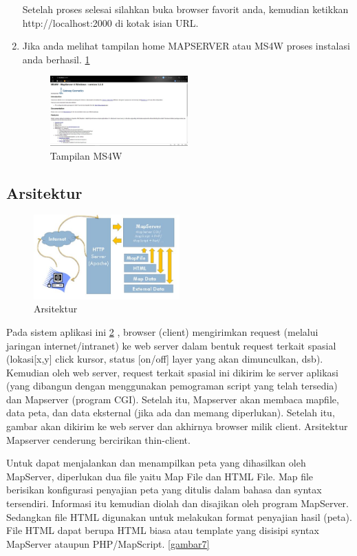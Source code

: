 \begin{enumerate}
Setelah proses selesai silahkan buka browser favorit anda, kemudian ketikkan http://localhost:2000 di kotak isian URL. 
\item
Jika anda melihat tampilan home MAPSERVER atau MS4W proses instalasi anda berhasil. \ref{gambar4}
\begin{figure}[ht]
	    \centerline{\includegraphics[width=0.50\textwidth]{figures/gambar4.JPG}}
	    \caption{Tampilan MS4W}
		\label{gambar4}
		\end{figure}
\end{enumerate}


\subsection{Arsitektur}
\begin{figure}[ht]
	    \centerline{\includegraphics[width=0.50\textwidth]{figures/gambar6.JPG}}
	    \caption{Arsitektur}
		\label{gambar6}
		\end{figure}
Pada sistem aplikasi ini \ref{gambar6} , browser (client) mengirimkan request (melalui jaringan internet/intranet) ke web server dalam bentuk request terkait spasial (lokasi[x,y] click kursor, status [on/off] layer yang akan dimunculkan, dsb).
Kemudian oleh web server, request terkait spasial ini dikirim ke server aplikasi (yang dibangun dengan menggunakan pemograman script yang telah tersedia) dan Mapserver (program CGI). Setelah itu, Mapserver akan membaca mapfile, data peta, dan data eksternal (jika ada dan memang diperlukan).
Setelah itu, gambar akan dikirim ke web server dan akhirnya browser milik client. Arsitektur Mapserver cenderung bercirikan thin-client.

Untuk dapat menjalankan dan menampilkan peta yang dihasilkan oleh MapServer, diperlukan dua file yaitu Map File dan HTML File. Map file berisikan konfigurasi penyajian peta yang ditulis dalam bahasa dan syntax tersendiri. Informasi itu kemudian diolah dan disajikan oleh program MapServer. 
Sedangkan file HTML digunakan untuk melakukan format penyajian hasil (peta). File HTML dapat berupa HTML biasa atau template yang disisipi syntax MapServer ataupun PHP/MapScript. \ref{gambar7}

